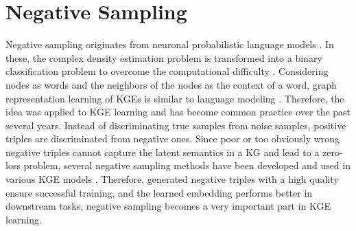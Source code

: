 \section{Negative Sampling}
\label{sec:negative_sampling}


Negative sampling originates from neuronal probabilistic language models \cite{qianunderstanding}.
In these, the complex density estimation problem is transformed into a binary classification problem to overcome the computational difficulty \cite{qianunderstanding}.
Considering nodes as words and the neighbors of the nodes as the context of a word, graph representation learning of \acp{KGE} is similar to language modeling \cite{qianunderstanding}.
Therefore, the idea was applied to \ac{KGE} learning and has become common practice over the past several years.
Instead of discriminating true samples from noise samples, positive triples are discriminated from negative ones.
Since poor or too obviously wrong negative triples cannot capture the latent semantics in a \ac{KG} and lead to a zero-loss problem, several negative sampling methods have been developed and used in various \ac{KGE} models \cite{qiannegative}.
Therefore, generated negative triples with a high quality ensure successful training, and the learned embedding performs better in downstream tasks, negative sampling becomes a very important part in \ac{KGE} learning.

